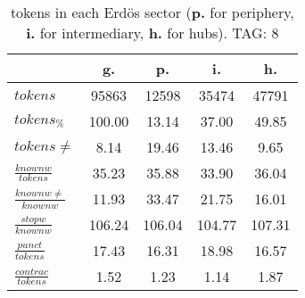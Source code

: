\begin{table}[h!]
\begin{center}
\begin{tabular}{| l | c | c | c | c |}\hline
 & g. & p. & i. & h. \\\hline
$tokens$ & 95863  & 12598  & 35474  & 47791 \\\hline
$tokens_{\%}$ & 100.00  & 13.14  & 37.00  & 49.85 \\\hline
$tokens \neq$ & 8.14  & 19.46  & 13.46  & 9.65 \\\hline
$\frac{knownw}{tokens}$ & 35.23  & 35.88  & 33.90  & 36.04 \\\hline
$\frac{knownw \neq}{knownw}$ & 11.93  & 33.47  & 21.75  & 16.01 \\\hline
$\frac{stopw}{knownw}$ & 106.24  & 106.04  & 104.77  & 107.31 \\\hline
$\frac{punct}{tokens}$ & 17.43  & 16.31  & 18.98  & 16.57 \\\hline
$\frac{contrac}{tokens}$ & 1.52  & 1.23  & 1.14  & 1.87 \\\hline
\end{tabular}
\caption{tokens in each Erd\"os sector ({{\bf p.}} for periphery, {{\bf i.}} for intermediary, 
    {{\bf h.}} for hubs). TAG: 8}
\end{center}
\end{table}